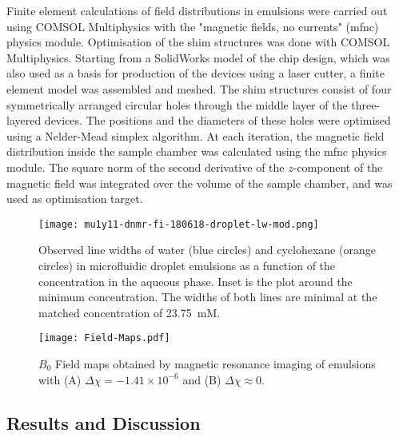 Finite element calculations of field distributions in emulsions
 were carried out using COMSOL Multiphysics with the "magnetic fields, no currents" (mfnc) physics module.
Optimisation of the shim structures was done with COMSOL Multiphysics.\cite{comsolmp} Starting from a SolidWorks model
of the chip design, which was also used as a basis for production of the devices using
a laser cutter, a finite element model was assembled and meshed. The shim structures consist
of four symmetrically arranged circular holes through the middle layer of the three-layered
devices. The positions and the diameters of these
holes were optimised using a Nelder-Mead simplex algorithm. At each iteration, the magnetic
field distribution inside the sample chamber was calculated using the mfnc physics module.
The square norm of the second derivative of the $z$-component of the magnetic field was integrated
over the volume of the sample chamber, and was used as optimisation target.

\begin{figure}
  \begin{center}
    \texttt{[image: mu1y11-dnmr-fi-180618-droplet-lw-mod.png]}
  \end{center}
  \caption{Observed line widths of water (blue circles) and
    cyclohexane (orange circles) in microfluidic droplet emulsions
    as a function of the  concentration in the aqueous phase. Inset is the plot around the minimum
    concentration.
    The widths of both lines are minimal
    at the matched concentration of 23.75~mM. }
    \label{fig:linewidths}
\end{figure}


\begin{figure}
  \begin{center}
    \texttt{[image: Field-Maps.pdf]}
  \end{center}
  \caption{$B_0$ Field maps obtained by magnetic resonance imaging of emulsions
  with (A) $\Delta\chi=-1.41\times 10^{-6}$ and (B) $\Delta\chi\approx 0$.
  }
  \label{fig:field-map}
\end{figure}




\subsection*{Results and Discussion}


